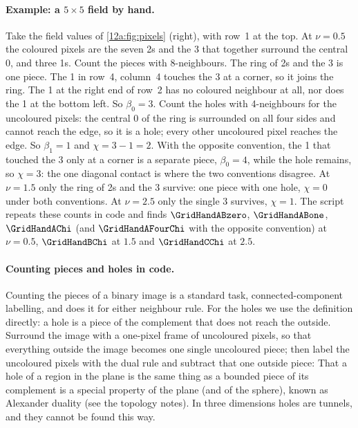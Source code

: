 \paragraph{Example: a $5\times5$ field by hand.} Take the field values of \cref{12a:fig:pixels}
(right), with row~1 at the top. At $\nu=0.5$ the coloured pixels are the seven 2s and the 3 that together
surround the central 0, and three 1s. Count the pieces with 8-neighbours. The ring of 2s and the 3 is
one piece. The 1 in row~4, column~4 touches the 3 at a corner, so it joins the ring. The 1 at the right end
of row~2 has no coloured neighbour at all, nor does the 1 at the bottom left. So $\beta_0=3$. Count the holes
with 4-neighbours for the uncoloured pixels: the central 0 of the ring is surrounded on all four sides and
cannot reach the edge, so it is a hole; every other uncoloured pixel reaches the edge. So $\beta_1=1$ and
$\chi=3-1=2$. With the opposite convention, the 1 that touched the 3 only at a corner is a separate piece,
$\beta_0=4$, while the hole remains, so $\chi=3$: the one diagonal contact is where the two conventions
disagree. At $\nu=1.5$ only the ring of 2s and the 3 survive: one piece with one hole, $\chi=0$ under both
conventions. At $\nu=2.5$ only the single 3 survives, $\chi=1$. The script
 repeats these counts in code and finds $\GridHandABzero$,
$\GridHandABone$, $\GridHandAChi$ (and $\GridHandAFourChi$ with the opposite convention) at $\nu=0.5$,
$\GridHandBChi$ at $1.5$ and $\GridHandCChi$ at $2.5$.

\paragraph{Counting pieces and holes in code.} Counting the pieces of a binary image is a standard task,
connected-component labelling, and  does it for either neighbour rule. For the
holes we use the definition directly: a hole is a piece of the complement that does not reach the outside.
Surround the image with a one-pixel frame of uncoloured pixels, so that everything outside the image becomes
one single uncoloured piece; then label the uncoloured pixels with the dual rule and subtract that one
outside piece:
\noindent That a hole of a region in the plane is the same thing as a bounded piece of its complement is a
special property of the plane (and of the sphere), known as Alexander duality (see the topology notes). In
three dimensions holes are tunnels, and they cannot be found this way.


